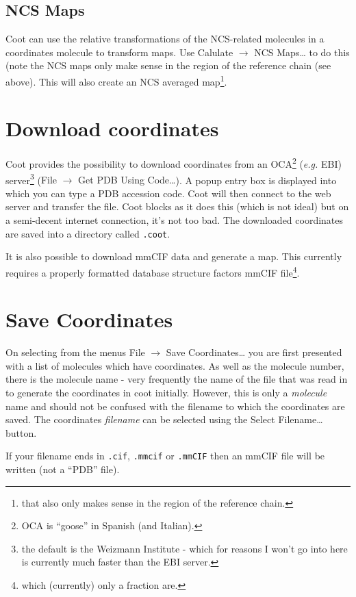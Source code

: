 \documentclass{book}
\begin{document}
\subsection{NCS Maps}
Coot can use the relative transformations of the NCS-related molecules
in a coordinates molecule to transform maps. Use \textsf{Calulate}
$\rightarrow$ \textsf{NCS Maps\ldots} to do this (note the NCS maps
only make sense in the region of the reference chain (see above).
This will also create an NCS averaged
map\footnote{that also only makes sense in the region of the reference
  chain.}.

\section{Download coordinates}
Coot provides the possibility to download coordinates from an
OCA\footnote{OCA is ``goose'' in Spanish (and Italian).
  } (\emph{e.g.} EBI) server\footnote{the default is the
  Weizmann Institute - which for reasons I won't go into here is
  currently much faster than the EBI server.} (\textsf{File
  $\rightarrow$ Get PDB Using Code\ldots}). A popup entry box is
displayed into which you can type a PDB accession code.  Coot will
then connect to the web server and transfer the file.  Coot blocks as
it does this (which is not ideal) but on a semi-decent internet
connection, it's not too bad.  The downloaded coordinates are saved
into a directory called \texttt{.coot}.

It is also possible to download mmCIF data and generate a map.  This
currently requires a properly formatted database structure factors
mmCIF file\footnote{which (currently) only a fraction are.}.

\section{Save Coordinates}
On selecting from the menus \textsf{File $\rightarrow$ Save
  Coordinates\ldots} you are first presented with a list of molecules
which have coordinates.  As well as the molecule number, there is the
molecule name - very frequently the name of the file that was read in
to generate the coordinates in coot initially.  However, this is only
a \emph{molecule} name and should not be confused with the filename to
which the coordinates are saved.  The coordinates \emph{filename} can
be selected using the \textsf{Select Filename\ldots} button.

If your filename ends in \texttt{.cif}, \texttt{.mmcif} or
\texttt{.mmCIF} then an mmCIF file will be written (not a ``PDB''
file).
\end{document}

